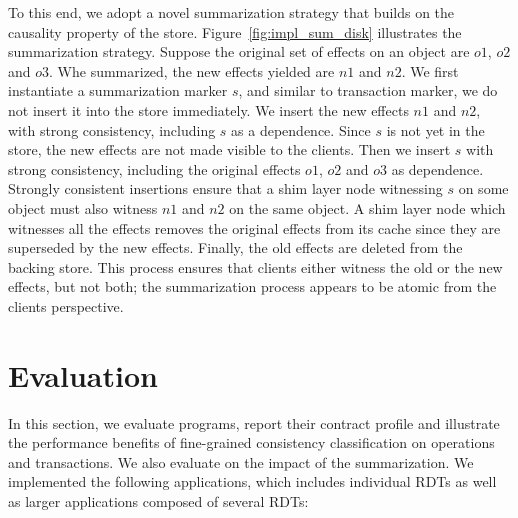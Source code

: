 To this end, we adopt a novel summarization strategy that builds on the
causality property of the store. Figure~\ref{fig:impl_sum_disk} illustrates the
summarization strategy. Suppose the original set of effects on an object are
$o1$, $o2$ and $o3$. Whe summarized, the new effects yielded are $n1$ and $n2$.
We first instantiate a summarization marker $s$, and similar to transaction
marker, we do not insert it into the store immediately. We insert the new
effects $n1$ and $n2$, with strong consistency, including $s$ as a dependence.
Since $s$ is not yet in the store, the new effects are not made visible to the
clients. Then we insert $s$ with strong consistency, including the original
effects $o1$, $o2$ and $o3$ as dependence. Strongly consistent insertions
ensure that a shim layer node witnessing $s$ on some object must also witness
$n1$ and $n2$ on the same object. A shim layer node which witnesses all the
effects removes the original effects from its cache since they are superseded
by the new effects. Finally, the old effects are deleted from the backing
store. This process ensures that clients either witness the old or the new
effects, but not both; the summarization process appears to be atomic from the
clients perspective.

\section{Evaluation}
\label{q_sec:results}

In this section, we evaluate \quelea programs, report their contract profile
and illustrate the performance benefits of fine-grained consistency
classification on operations and transactions. We also evaluate on the impact
of the summarization. We implemented the following applications, which includes
individual RDTs as well as larger applications composed of several RDTs:

